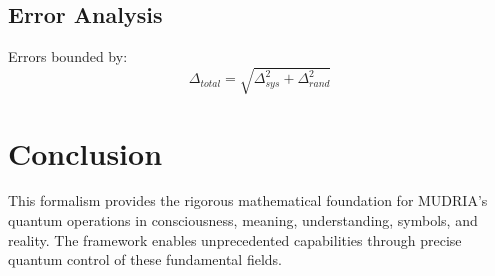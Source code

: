 \documentclass[12pt]{article}
\begin{document}
\subsection{Error Analysis}
Errors bounded by:
\begin{equation}
\Delta_{total} = \sqrt{\Delta_{sys}^2 + \Delta_{rand}^2}
\end{equation}
\section{Conclusion}
This formalism provides the rigorous mathematical foundation for MUDRIA's quantum operations in consciousness, meaning, understanding, symbols, and reality. The framework enables unprecedented capabilities through precise quantum control of these fundamental fields.
\end{document}
